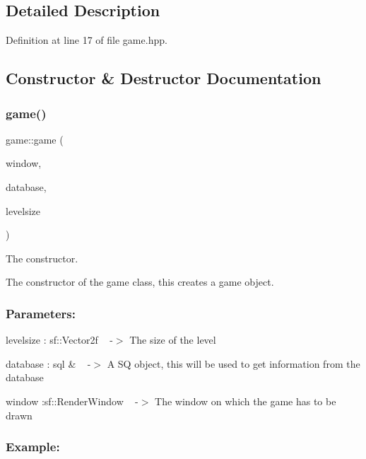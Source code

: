 \subsection{Detailed Description}


Definition at line 17 of file game.\+hpp.



\subsection{Constructor \& Destructor Documentation}
\mbox{\label{classgame_a46eaf7a077e7f3ff0b5e229142358f00}} 
\subsubsection{\texorpdfstring{game()}{game()}}
{\footnotesize\ttfamily game\+::game (\begin{DoxyParamCaption}\item[{sf\+::\+Render\+Window \&}]{window,  }\item[{\hyperlink{classsql}{sql} \&}]{database,  }\item[{sf\+::\+Vector2f}]{levelsize }\end{DoxyParamCaption})}



The constructor. 

The constructor of the \textquotesingle{}game\textquotesingle{} class, this creates a game object.~\newline


\subsubsection*{Parameters\+: }

levelsize \+: sf\+::\+Vector2f ~\newline
-\/$>$ The size of the level

database \+: sql \& ~\newline
-\/$>$ A \textquotesingle{}SQ\textquotesingle{} object, this will be used to get information from the database

window \+:sf\+::\+Render\+Window ~\newline
-\/$>$ The window on which the game has to be drawn

\subsubsection*{Example\+: }

